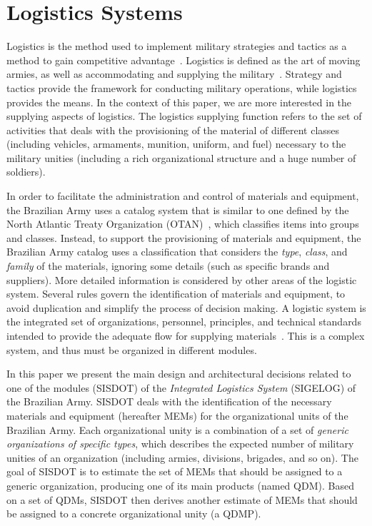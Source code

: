 \section{Logistics Systems}
\label{sec:logistics}

Logistics is the method used to implement military strategies and tactics as a method to gain 
competitive advantage~\cite{rutner2012}. Logistics is defined as the art of moving armies, 
as well as accommodating and supplying the military~\cite{prebilic2006}. Strategy and tactics 
provide the framework for conducting military operations, while logistics provides the means.
In the context of this paper, we are more interested in the supplying aspects of logistics. 
The logistics supplying function refers to the set of activities that deals with the  provisioning of 
the material of different classes (including vehicles, armaments, munition, uniform, and fuel) necessary to the 
military unities (including a rich organizational structure and a huge number of soldiers). 

In order to facilitate the administration and control of materials and equipment, the Brazilian Army uses a 
catalog system that is similar to one defined by the North Atlantic Treaty Organization (OTAN)~\cite{otan2012}, 
which classifies items into groups and classes. Instead, to support the provisioning of materials and equipment, 
the Brazilian Army catalog uses a classification that considers the \emph{type}, \emph{class}, and \emph{family} of the 
materials, ignoring some details (such as specific brands and suppliers). More detailed information is considered by 
other areas of the logistic system. Several rules govern the identification of materials and equipment, 
to avoid duplication and simplify the process of decision making. A logistic system is the integrated set of organizations, 
personnel, principles, and technical standards intended to provide the adequate flow for supplying materials~\cite{brasil2003}. 
This is a complex system, and thus must be organized in different modules. 

In this paper we present the main design and architectural decisions related to one of the modules (SISDOT) of the \emph{Integrated 
Logistics System} (SIGELOG) of the Brazilian Army. SISDOT deals with the identification of the necessary 
materials and equipment (hereafter MEMs) for the organizational units of the Brazilian Army. Each organizational 
unity is a combination of a set of \emph{generic organizations of specific types}, which describes the expected 
number of military unities of an organization (including armies, divisions, brigades, and so on). The goal of 
SISDOT is to estimate the set of MEMs that should be assigned to a generic organization, producing 
one of its main products (named QDM). Based on a set of QDMs, SISDOT then derives another estimate 
of MEMs that should be assigned to a concrete organizational unity (a QDMP). 

